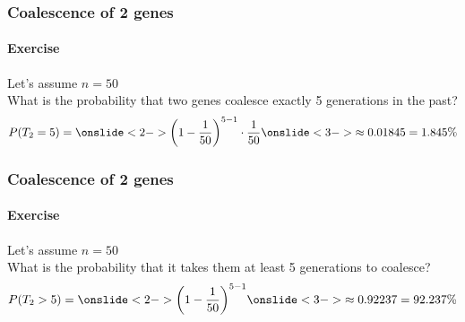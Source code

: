 \documentclass{beamer}
\begin{document}
        \begin{frame}
            \frametitle{Coalescence of 2 genes}
            \framesubtitle{Exercise}
            Let's assume $n = 50$ \\
            What is the probability that two genes coalesce exactly 5 generations in the past? \\ 
                \[
                    P(T_{2} = 5) =
                    \onslide<2->{\left(1 - \frac{1}{50}\right)^{5-1} \cdot \frac{1}{50}}
                    \onslide<3->{\approx 0.01845 = 1.845\%}
                \]
        \end{frame}

        \begin{frame}
            \frametitle{Coalescence of 2 genes}
            \framesubtitle{Exercise}
            Let's assume $n = 50$ \\
            What is the probability that it takes them at least 5 generations to coalesce? \\ 
                \[
                    P(T_{2} > 5) =
                    \onslide<2->{\left(1 - \frac{1}{50}\right)^{5-1}}
                    \onslide<3->{\approx 0.92237 = 92.237\%}
                \]
        \end{frame}
\end{document}
